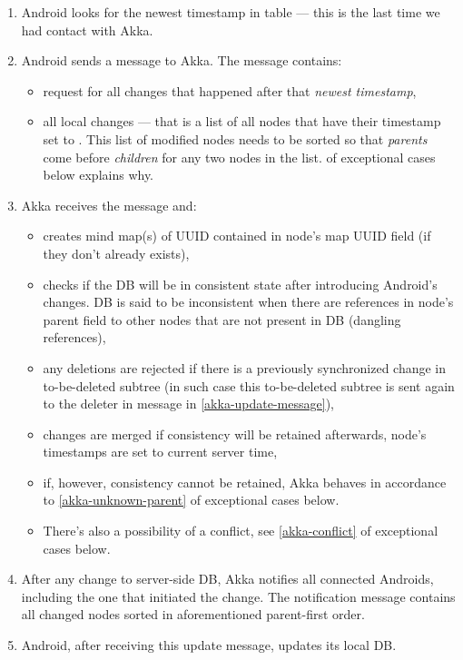 \begin{enumerate}
	\item Android looks for the newest timestamp in  table --- this is the last time we had contact with Akka.

	\item Android sends a message to Akka. The message contains:
	\begin{itemize}
		\item request for all changes that happened after that \emph{newest timestamp},
		\item all local changes --- that is a list of all nodes that have their timestamp set to . This list of modified nodes needs to be sorted so that \emph{parents} come before \emph{children} for any two nodes in the list.  of exceptional cases below explains why.
	\end{itemize}

	\item Akka receives the message and:
	\begin{itemize}
		\item creates mind map(s) of UUID contained in node's map UUID field (if they don't already exists),
		\item checks if the DB will be in consistent state after introducing Android's changes. DB is said to be inconsistent when there are references in node's parent field to other nodes that are not present in DB (dangling references),
		\item any deletions are rejected if there is a previously synchronized change in to-be-deleted subtree (in such case this to-be-deleted subtree is sent again to the deleter in message in \cref{akka-update-message}),
		\item changes are merged if consistency will be retained afterwards, node's timestamps are set to current server time,
		\item if, however, consistency cannot be retained, Akka behaves in accordance to \cref{akka-unknown-parent} of exceptional cases below.
		\item There's also a possibility of a conflict, see \cref{akka-conflict} of exceptional cases below.
	\end{itemize}

	\item \label{akka-update-message} After any change to server-side DB, Akka notifies all connected Androids, including the one that initiated the change. The notification message contains all changed nodes sorted in aforementioned parent-first order.

	\item Android, after receiving this update message, updates its local DB.
\end{enumerate}

